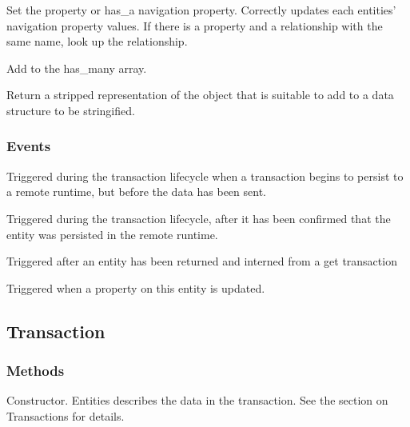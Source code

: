\documentclass{article}
\begin{document}
	{Set the property or {\ilcode has\_a} navigation property. Correctly updates
	each entities' navigation property values. If there is a property and a
	relationship with the same name, look up the relationship.}
	{
	}

	{Add to the {\ilcode has\_many} array.}
	{
	}

	{Return a stripped representation of the object that is suitable to add to
	a data structure to be stringified.}
	{
	}

\subsubsection{Events}
	{Triggered during the transaction lifecycle when a transaction begins to
	persist to a remote runtime, but before the data has been sent.}
	{
	}

	{Triggered during the transaction lifecycle, after it has been confirmed
	that the entity was persisted in the remote runtime.}
	{}

	{Triggered after an entity has been returned and interned from a {\ilcode
	get} transaction}
	{}

	{Triggered when a property on this entity is updated.}
	{
	}

\subsection{Transaction}
\subsubsection{Methods}
	{Constructor. Entities describes the data in the transaction. See the
	section on Transactions for details.}
	{	
	}
\end{document}
